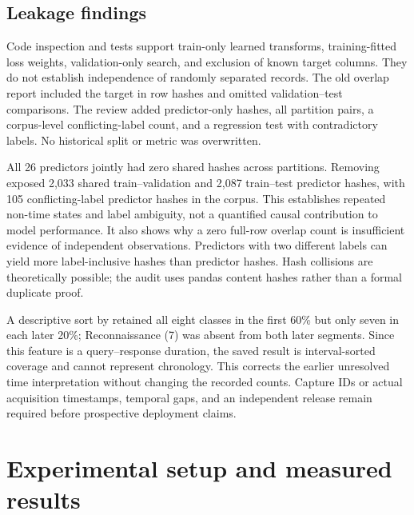 \documentclass[11pt,a4paper]{report}
\begin{document}
\section{Leakage findings}
Code inspection and tests support train-only learned transforms, training-fitted loss weights, validation-only search, and exclusion of known target columns. They do not establish independence of randomly separated records. The old overlap report included the target in row hashes and omitted validation--test comparisons. The review added predictor-only hashes, all partition pairs, a corpus-level conflicting-label count, and a regression test with contradictory labels. No historical split or metric was overwritten.

\begin{table}[htbp]\centering
\caption{New content-overlap audit. Counts denote unique content hashes, not affected row counts. The last row is computed across the complete corpus.}\end{table}

All 26 predictors jointly had zero shared hashes across partitions. Removing  exposed 2,033 shared train--validation and 2,087 train--test predictor hashes, with 105 conflicting-label predictor hashes in the corpus. This establishes repeated non-time states and label ambiguity, not a quantified causal contribution to model performance. It also shows why a zero full-row overlap count is insufficient evidence of independent observations. Predictors with two different labels can yield more label-inclusive hashes than predictor hashes. Hash collisions are theoretically possible; the audit uses pandas content hashes rather than a formal duplicate proof.

A descriptive sort by  retained all eight classes in the first 60\% but only seven in each later 20\%; Reconnaissance (7) was absent from both later segments. Since this feature is a query--response duration, the saved result is interval-sorted coverage and cannot represent chronology. This corrects the earlier unresolved time interpretation without changing the recorded counts. Capture IDs or actual acquisition timestamps, temporal gaps, and an independent release remain required before prospective deployment claims.

\chapter{Experimental setup and measured results}
\end{document}
